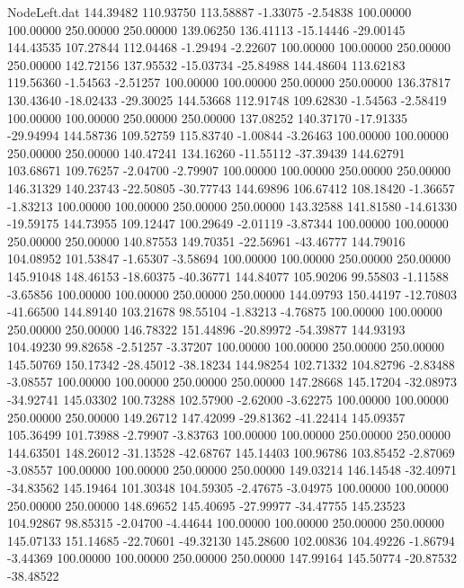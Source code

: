\begin{filecontents}{NodeLeft.dat}
 144.39482  110.93750  113.58887    -1.33075   -2.54838  100.00000  100.00000  250.00000  250.00000  139.06250  136.41113  -15.14446  -29.00145
 144.43535  107.27844  112.04468    -1.29494   -2.22607  100.00000  100.00000  250.00000  250.00000  142.72156  137.95532  -15.03734  -25.84988
 144.48604  113.62183  119.56360    -1.54563   -2.51257  100.00000  100.00000  250.00000  250.00000  136.37817  130.43640  -18.02433  -29.30025
 144.53668  112.91748  109.62830    -1.54563   -2.58419  100.00000  100.00000  250.00000  250.00000  137.08252  140.37170  -17.91335  -29.94994
 144.58736  109.52759  115.83740    -1.00844   -3.26463  100.00000  100.00000  250.00000  250.00000  140.47241  134.16260  -11.55112  -37.39439
 144.62791  103.68671  109.76257    -2.04700   -2.79907  100.00000  100.00000  250.00000  250.00000  146.31329  140.23743  -22.50805  -30.77743
 144.69896  106.67412  108.18420    -1.36657   -1.83213  100.00000  100.00000  250.00000  250.00000  143.32588  141.81580  -14.61330  -19.59175
 144.73955  109.12447  100.29649    -2.01119   -3.87344  100.00000  100.00000  250.00000  250.00000  140.87553  149.70351  -22.56961  -43.46777
 144.79016  104.08952  101.53847    -1.65307   -3.58694  100.00000  100.00000  250.00000  250.00000  145.91048  148.46153  -18.60375  -40.36771
 144.84077  105.90206   99.55803    -1.11588   -3.65856  100.00000  100.00000  250.00000  250.00000  144.09793  150.44197  -12.70803  -41.66500
 144.89140  103.21678   98.55104    -1.83213   -4.76875  100.00000  100.00000  250.00000  250.00000  146.78322  151.44896  -20.89972  -54.39877
 144.93193  104.49230   99.82658    -2.51257   -3.37207  100.00000  100.00000  250.00000  250.00000  145.50769  150.17342  -28.45012  -38.18234
 144.98254  102.71332  104.82796    -2.83488   -3.08557  100.00000  100.00000  250.00000  250.00000  147.28668  145.17204  -32.08973  -34.92741
 145.03302  100.73288  102.57900    -2.62000   -3.62275  100.00000  100.00000  250.00000  250.00000  149.26712  147.42099  -29.81362  -41.22414
 145.09357  105.36499  101.73988    -2.79907   -3.83763  100.00000  100.00000  250.00000  250.00000  144.63501  148.26012  -31.13528  -42.68767
 145.14403  100.96786  103.85452    -2.87069   -3.08557  100.00000  100.00000  250.00000  250.00000  149.03214  146.14548  -32.40971  -34.83562
 145.19464  101.30348  104.59305    -2.47675   -3.04975  100.00000  100.00000  250.00000  250.00000  148.69652  145.40695  -27.99977  -34.47755
 145.23523  104.92867   98.85315    -2.04700   -4.44644  100.00000  100.00000  250.00000  250.00000  145.07133  151.14685  -22.70601  -49.32130
 145.28600  102.00836  104.49226    -1.86794   -3.44369  100.00000  100.00000  250.00000  250.00000  147.99164  145.50774  -20.87532  -38.48522

\end{filecontents}
